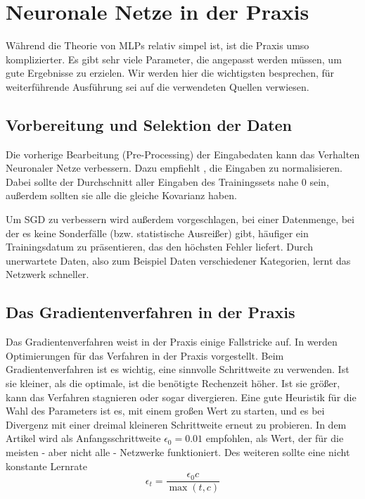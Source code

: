 \section{Neuronale Netze in der Praxis}
Während die Theorie von MLPs relativ simpel ist, ist die Praxis umso komplizierter. Es gibt sehr viele Parameter, die angepasst werden müssen, um gute Ergebnisse zu erzielen. Wir werden hier die wichtigsten besprechen, für weiterführende Ausführung sei auf die verwendeten Quellen verwiesen. 

\subsection{Vorbereitung und Selektion der Daten}
Die vorherige Bearbeitung (Pre-Processing) der Eingabedaten kann das Verhalten Neuronaler Netze verbessern. 
Dazu empfiehlt \cite{lecunefficient}, die Eingaben zu normalisieren.
Dabei sollte der Durchschnitt aller Eingaben des Trainingssets nahe $0$ sein, außerdem sollten sie alle die gleiche Kovarianz haben.

Um SGD zu verbessern wird außerdem vorgeschlagen, bei einer Datenmenge, bei der es keine Sonderfälle (bzw. statistische Ausreißer) gibt, häufiger ein Trainingsdatum zu präsentieren, das den höchsten Fehler liefert. Durch unerwartete Daten, also zum Beispiel Daten verschiedener Kategorien, lernt das Netzwerk schneller.

\subsection{Das Gradientenverfahren in der Praxis}
Das Gradientenverfahren weist in der Praxis einige Fallstricke auf. In \cite{bengio2012practical} werden Optimierungen für das Verfahren in der Praxis vorgestellt. 
Beim Gradientenverfahren ist es wichtig, eine sinnvolle Schrittweite zu verwenden. Ist sie kleiner, als die optimale, ist die benötigte Rechenzeit höher. Ist sie größer, kann das Verfahren stagnieren oder sogar divergieren. Eine gute Heuristik für die Wahl des Parameters ist es, mit einem großen Wert zu starten, und es bei Divergenz mit einer dreimal kleineren Schrittweite erneut zu probieren.
In dem Artikel wird als Anfangsschrittweite $\epsilon_0 = 0.01$ empfohlen, als Wert, der für die meisten - aber nicht alle - Netzwerke funktioniert.
Des weiteren sollte eine nicht konstante Lernrate 
\begin{equation}
	\epsilon_t = \frac{\epsilon_0 c}{\max(t, c)}
\end{equation}

